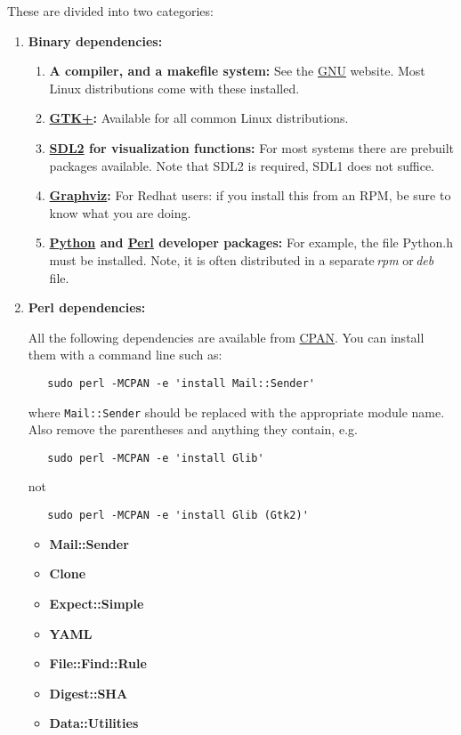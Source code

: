 \documentclass[12pt]{article}
\begin{document}
These are divided into two categories:
\begin{enumerate}
\item {\bf Binary dependencies:}
\begin{enumerate}
\item {\bf A compiler, and a makefile system:} See the \href{http://www.gnu.org/}{GNU} website. Most Linux distributions come with these installed.
\item {\bf \href{http://www.gtk.org/}{GTK+}:} Available for all common Linux distributions.
\item {\bf \href{http://simpledirectorylisting.net/}{SDL2} for visualization functions:} For most systems there are prebuilt packages available. Note that SDL2 is required, SDL1 does not suffice.
\item {\bf \href{http://www.graphviz.org}{Graphviz}:} For Redhat users: if you install this from an RPM, be sure to know what you are doing.
\item {\bf  \href{http://www.python.org/}{Python} and  \href{http://www.perl.org/}{Perl} developer packages:} For example, the file Python.h must be installed. Note, it is often distributed in a separate\,{\it rpm} or\,{\it deb} file. 
\end{enumerate}

\item {\bf Perl dependencies:}

All the following dependencies are available from \href{http://search.cpan.org/}{CPAN}. You can install them with a command line such as:
\begin{verbatim}
   sudo perl -MCPAN -e 'install Mail::Sender'
\end{verbatim}
where {\tt Mail::Sender} should be replaced with the appropriate module name. Also remove the parentheses and anything they contain, e.g.
\begin{verbatim}
   sudo perl -MCPAN -e 'install Glib'
\end{verbatim}
not
\begin{verbatim}
   sudo perl -MCPAN -e 'install Glib (Gtk2)'
\end{verbatim}

\begin{itemize}
\item {\bf Mail::Sender}
\item {\bf Clone}
\item {\bf Expect::Simple}
\item {\bf YAML}
\item {\bf File::Find::Rule}
\item {\bf Digest::SHA}
\item {\bf Data::Utilities} 
\end{itemize}


\end{enumerate}
\end{document}
